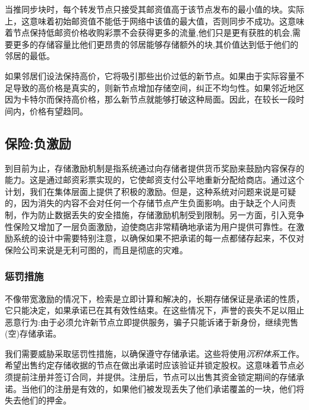 当推同步块时，每个转发节点只接受其邮资值高于该节点发布的最小值的块。实际上，这意味着初始邮资值不能低于网络中该值的最大值，否则同步不成功。这意味着节点保持低邮资价格收购彩票不会获得更多的流量,他们只是更有获胜的机会,需要更多的存储容量比他们更昂贵的邻居能够存储额外的块,其价值达到低于他们的邻居的最低。

如果邻居们设法保持高价，它将吸引那些出价过低的新节点。如果由于实际容量不足导致的高价格是真实的，则新节点增加存储空间，纠正不均匀性。如果邻近地区因为卡特尔而保持高价格，那么新节点就能够打破这种局面。因此，在较长一段时间内，价格有望趋同。








\subsection{保险:负激励\statusorange}\label{sec:chunk-insurance}


到目前为止，存储激励机制是指系统通过向存储者提供货币奖励来鼓励内容保存的能力。这是通过邮资彩票实现的，它使邮资支付公平地重新分配给商店。通过这个计划，我们在集体层面上提供了积极的激励。但是，这种系统对问题来说是可疑的，因为消失的内容不会对任何一个存储节点产生负面影响。由于缺乏个人问责制，作为防止数据丢失的安全措施，存储激励机制受到限制。另一方面，引入竞争性保险又增加了一层负面激励，迫使商店非常精确地承诺为用户提供可靠性。在激励系统的设计中需要特别注意，以确保如果不把承诺的每一点都储存起来，不仅对保险公司来说是无利可图的，而且是彻底的灾难。 

\subsubsection{惩罚措施}

不像带宽激励的情况下，检索是立即计算和解决的，长期存储保证是承诺的性质，它只能决定，如果承诺已在其有效性结束。在这些情况下，声誉的丧失不足以阻止恶意行为:由于必须允许新节点立即提供服务，骗子只能诉诸于新身份，继续兜售(空)存储承诺。

我们需要威胁采取惩罚性措施，以确保遵守存储承诺。这些将使用\emph{沉积体系}工作。希望出售约定存储收据的节点在做出承诺时应该验证并锁定股权。这意味着节点必须提前注册并签订合同，并提供。注册后，节点可以出售其资金锁定期间的存储承诺。当他们的注册是有效的，如果他们被发现丢失了他们承诺覆盖的一块，他们将失去他们的押金。

